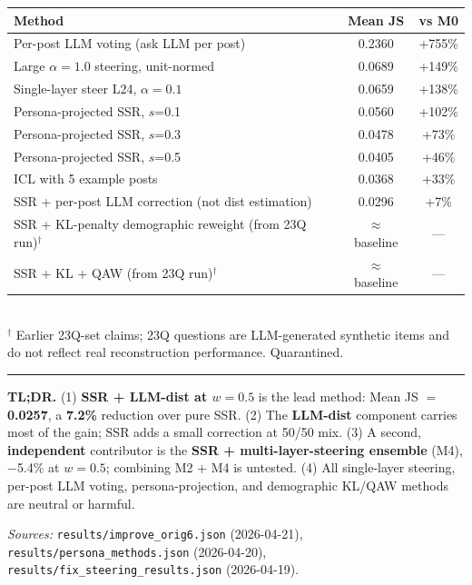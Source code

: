 \documentclass[10pt,a4paper]{article}
\begin{document}
\centering\small
\begin{tabular}{@{}lcc@{}}
\toprule
Method & Mean JS & vs M0 \\
\midrule
\rowcolor{badrow} Per-post LLM voting (ask LLM per post)        & 0.2360 & +755\% \\
\rowcolor{badrow} Large $\alpha{=}1.0$ steering, unit-normed    & 0.0689 & +149\% \\
\rowcolor{badrow} Single-layer steer L24, $\alpha{=}0.1$        & 0.0659 & +138\% \\
\rowcolor{badrow} Persona-projected SSR, $s$=0.1                & 0.0560 & +102\% \\
\rowcolor{badrow} Persona-projected SSR, $s$=0.3                & 0.0478 & +73\% \\
Persona-projected SSR, $s$=0.5                                  & 0.0405 & +46\% \\
ICL with 5 example posts                                        & 0.0368 & +33\% \\
SSR + per-post LLM correction (not dist estimation)             & 0.0296 & +7\% \\
\midrule
SSR + KL-penalty demographic reweight (from 23Q run)$^\dagger$  & $\approx$baseline & --- \\
SSR + KL + QAW (from 23Q run)$^\dagger$                         & $\approx$baseline & --- \\
\bottomrule
\end{tabular}
\\[2pt]
{\footnotesize $^\dagger$ Earlier 23Q-set claims; 23Q questions are LLM-generated synthetic items and do not reflect real reconstruction performance. Quarantined.}
\flushleft

\vspace{8pt}\hrule\vspace{4pt}

\textbf{TL;DR.}
(1) \textbf{SSR + LLM-dist at $w{=}0.5$} is the lead method: Mean JS $=$ \textbf{0.0257}, a \textbf{7.2\%} reduction over pure SSR.
(2) The \textbf{LLM-dist} component carries most of the gain; SSR adds a small correction at 50/50 mix.
(3) A second, \textbf{independent} contributor is the \textbf{SSR + multi-layer-steering ensemble} (M4), $-$5.4\% at $w{=}0.5$; combining M2 + M4 is untested.
(4) All single-layer steering, per-post LLM voting, persona-projection, and demographic KL/QAW methods are neutral or harmful.

\vspace{4pt}
{\footnotesize \textit{Sources:} \texttt{results/improve\_orig6.json} (2026-04-21), \texttt{results/persona\_methods.json} (2026-04-20), \texttt{results/fix\_steering\_results.json} (2026-04-19).}
\end{document}
